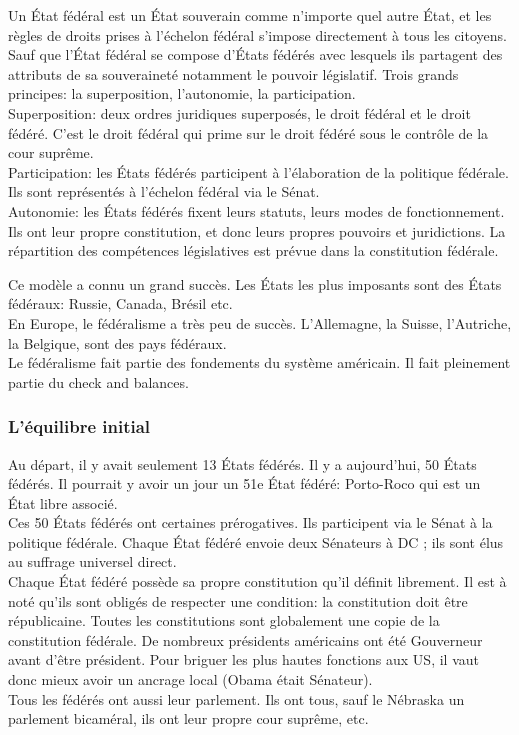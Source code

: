\documentclass[10pt, a4paper, openany]{book}
\begin{document}
Un État fédéral est un État souverain comme n'importe quel autre État, et les règles de droits prises à l'échelon fédéral s'impose directement à tous les citoyens. Sauf que l'État fédéral se compose d'États fédérés avec lesquels ils partagent des attributs de sa souveraineté notamment le pouvoir législatif. Trois grands principes: la superposition, l'autonomie, la participation. \\
Superposition: deux ordres juridiques superposés, le droit fédéral et le droit fédéré. C'est le droit fédéral qui prime sur le droit fédéré sous le contrôle de la cour suprême. \\
Participation: les États fédérés participent à l'élaboration de la politique fédérale. Ils sont représentés à l'échelon fédéral via le Sénat. \\
Autonomie: les États fédérés fixent leurs statuts, leurs modes de fonctionnement. Ils ont leur propre constitution, et donc leurs propres pouvoirs et juridictions. La répartition des compétences législatives est prévue dans la constitution fédérale. 


Ce modèle a connu un grand succès. Les États les plus imposants sont des États fédéraux: Russie, Canada, Brésil etc. \\
En Europe, le fédéralisme a très peu de succès. L'Allemagne, la Suisse, l'Autriche, la Belgique, sont des pays fédéraux. \\
Le fédéralisme fait partie des fondements du système américain. Il fait pleinement partie du check and balances. 

\subsubsection{L'équilibre initial}

Au départ, il y avait seulement 13 États fédérés. Il y a aujourd'hui, 50 États fédérés. Il pourrait y avoir un jour un 51e État fédéré: Porto-Roco qui est un État libre associé. \\
Ces 50 États fédérés ont certaines prérogatives. Ils participent via le Sénat à la politique fédérale. Chaque État fédéré envoie deux Sénateurs à DC ; ils sont élus au suffrage universel direct. \\
Chaque État fédéré possède sa propre constitution qu'il définit librement. Il est à noté qu'ils sont obligés de respecter une condition: la constitution doit être républicaine. Toutes les constitutions sont globalement une copie de la constitution fédérale. De nombreux présidents américains ont été Gouverneur avant d'être président. Pour briguer les plus hautes fonctions aux US, il vaut donc mieux avoir un ancrage local (Obama était Sénateur). \\
Tous les fédérés ont aussi leur parlement. Ils ont tous, sauf le Nébraska un parlement bicaméral, ils ont leur propre cour suprême, etc.
\end{document}

